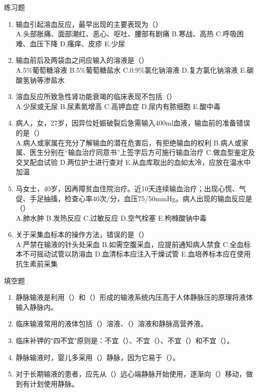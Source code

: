 \documentclass[11pt, a4paper]{ctexart}
\begin{document}
\begin{examplebox}{练习题}
	\begin{enumerate}
		\item 输血引起溶血反应，最早出现的主要表现为（\qquad）\\
		      A.头部胀痛、面部潮红、恶心、呕吐、腰部有剧痛 \quad B.寒战、高热 \quad C.呼吸困难、血压下降 \quad D.瘙痒、皮疹 \quad E.少尿
		\item 输血前后及两袋血之间应输入的溶液是（\qquad）\\
		      A.5\%葡萄糖溶液 \quad B.5\%葡萄糖盐水 \quad C.0.9\%氯化钠溶液 \quad D.复方氯化钠溶液 \quad E.碳酸氢钠等渗盐水
		\item 溶血反应所致急性肾功能衰竭的临床表现不包括（\qquad）\\
		      A.少尿或无尿 \quad B.尿素氮增高 \quad C.高钾血症 \quad D.尿内有脓细胞 \quad E.酸中毒
		\item 病人，女，27岁，因异位妊娠破裂后急需输入400ml血液，输血前的准备错误的是（\qquad）\\
		      A.病人或家属在充分了解输血的潜在危害后，有拒绝输血的权利 \quad B.病人或家属、医生分别在“输血治疗同意书”上签字后方可施行输血治疗 \quad C.做血型鉴定及交叉配血试验 \quad D.两位护士进行查对 \quad E.从血库取出的血如太冷，应放在温水中加温
		\item 马女士，40岁，因再障贫血住院治疗。近10天连续输血治疗；出现心慌、气促、手足抽搐，检查心率40次/分，血压75/50mmHg。病人出现的输血反应是（\qquad）\\
		      A.肺水肿 \quad B.发热反应 \quad C.过敏反应 \quad D.空气栓塞 \quad E.枸橼酸钠中毒
		\item 关于采集血标本的操作方法，错误的是（\qquad）\\
		      A.严禁在输液的针头处采血 \quad B.如需空腹采血，应提前通知病人禁食 \quad C.全血标本不可摇动试管以防溶血 \quad D.血清标本应注入干燥试管 \quad E.血培养标本应在使用抗生素前采集
	\end{enumerate}
\end{examplebox}

\begin{tipsbox}{填空题}
	\begin{enumerate}
		\item 静脉输液是利用（\qquad）和（\qquad）形成的输液系统内压高于人体静脉压的原理将液体输入静脉内。
		\item 临床输液常用的液体包括（\qquad）溶液、（\qquad）溶液和静脉高营养液。
		\item 临床补钾的"四不宜"原则是：不宜（\qquad）、不宜（\qquad）、不宜（\qquad）和不宜（\qquad）。
		\item 静脉输液时，婴儿多采用（\qquad）静脉，因为它易于（\qquad）。
		\item 对于长期输液的患者，应先从（\qquad）远心端静脉开始使用，逐渐向（\qquad）移动，做到有计划使用静脉。
	\end{enumerate}
\end{tipsbox}
\end{document}
